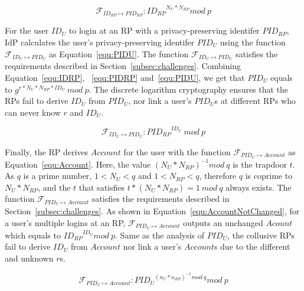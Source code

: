  \begin{equation}
    \mathcal{F}_{ID_{RP} \mapsto PID_{RP}}: {ID_{RP}}^{N_{U}* N_{RP}} mod \ p
   \label{equ:PIDRP}
   \end{equation}

For the user $ID_U$ to login at an RP with a privacy-preserving identifer $PID_{RP}$, IdP calculates the user's privacy-preserving identifer $PID_U$ using the function  $\mathcal{F}_{ID_{U} \mapsto PID_{U}}$ as Equation~\ref{equ:PIDU}. The function $\mathcal{F}_{ID_{U} \mapsto PID_{U}}$ satisfies the requirements described in Section~\ref{subsec:challenges}.
Combining Equation~\ref{equ:IDRP}, ~\ref{equ:PIDRP} and~\ref{equ:PIDU}, we get that  $PID_U$ equals to $g^{r*N_U*N_{RP}*ID_U}\ mod \ p$.
The discrete logarithm cryptography ensures that the RPs fail to derive $ID_U$ from $PID_U$,
nor link a user's $PID_U$s at different RPs who can never  know $r$ and $ID_U$. %


\begin{equation}
 \mathcal{F}_{ID_{U} \mapsto PID_{U}}: {PID_{RP}}^{ID_U} \ mod \ p
 \label{equ:PIDU}
\end{equation}

Finally, the RP derives $Account$ for the user with the function $\mathcal{F}_{PID_{U} \mapsto Account}$ as Equation~\ref{equ:Account}. Here, the value $(N_U*N_{RP})^{-1} mod \ q$ is the trapdoor $t$. As $q$ is a prime number, $1< N_U < q$ and $1< N_{RP} < q$, therefore $q$ is coprime to $N_U*N_{RP}$, and the $t$ that satisfies $t*(N_U*N_{RP}) = 1\ mod \ q$ always exists. The function $\mathcal{F}_{PID_{U} \mapsto Account}$ satisfies the requirements described in Section~\ref{subsec:challenges}.  As shown in Equation~\ref{equ:AccountNotChanged},  for a user's multiple logins at an RP, $\mathcal{F}_{PID_{U} \mapsto Account}$ outputs an unchanged $Acount$  which equals to ${{ID_{RP}}^{ID_U}} mod \ p$.
Same as the analysis of $PID_U$, the collusive RPs fail to derive $ID_U$ from $Account$ nor link a user's $Account$s due to the different and unknown $r$s.

 \begin{equation}
   \mathcal{F}_{PID_{U} \mapsto Account}: {PID_U}^{(n_U*n_{RP})^{-1} mod \ q} mod \ p
   \label{equ:Account}
   \end{equation}

